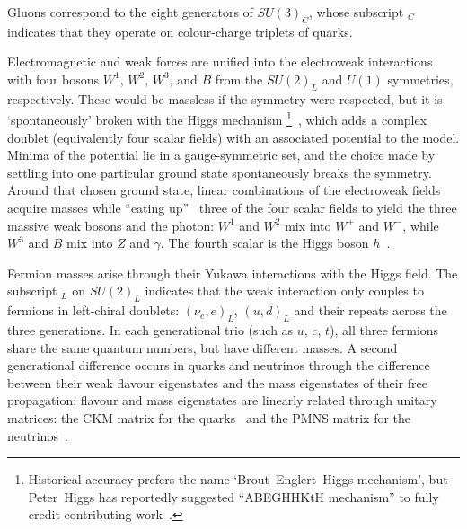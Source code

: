 Gluons correspond to the eight generators of $SU\!(3)_C$, whose
subscript $_C$ indicates that they operate on colour-charge triplets of quarks.

Electromagnetic and weak forces are unified into the electroweak
interactions with four bosons $W^1$, $W^2$, $W^3$, and $B$ from the
$SU\!(2)_L$ and $U\!(1)$ symmetries, respectively.
These would be massless if the symmetry were respected, but it is
`spontaneously' broken with the Higgs mechanism
\footnote{%
Historical accuracy prefers the name `Brout–Englert–Higgs mechanism', but
Peter~Higgs has reportedly suggested ``ABEGHHKtH mechanism'' to fully credit
contributing work~\cite{close2011infinity}.%
}~\cite{
higgs1964broken,
englert1964broken
},
which adds a complex doublet (equivalently four scalar fields) with an
associated potential to the model.
Minima of the potential lie in a gauge-symmetric set, and the choice made by
settling into one particular ground state spontaneously breaks the symmetry.
Around that chosen ground state, linear combinations of the electroweak fields
acquire masses while ``eating up''~\cite{rubakov1999classical} three of the
four scalar fields to yield the three massive weak bosons and the photon:
$W^1$ and $W^2$ mix into $W^+$ and $W^-$, while $W^3$ and $B$ mix into $Z$ and
$\gamma$.
The fourth scalar is the Higgs boson $h$~\cite{
glashow1959renorm,
weinberg1967model,
salam1959weak,
rubakov1999classical,
cottingham2007greenwood
}.

Fermion masses arise through their Yukawa interactions with the Higgs field.
The subscript $_L$ on $SU\!(2)_L$ indicates that the weak interaction only
couples to fermions in left-chiral doublets: $(\nu_e, e)_L$,
$(u, d)_L$ and their repeats across the three generations.
In each generational trio (such as $u$, $c$, $t$), all three fermions share the
same quantum numbers, but have different masses.
A second generational difference occurs in quarks and neutrinos through the
difference between their weak flavour eigenstates and the mass eigenstates of
their free propagation;
flavour and mass eigenstates are linearly related through unitary matrices:
the CKM matrix for the quarks~\cite{
cabibbo1963unitary,
kabayasji1973cpv
}
and the PMNS matrix for the neutrinos~\cite{
maki1962remarks,
thomson2013modern
}.


